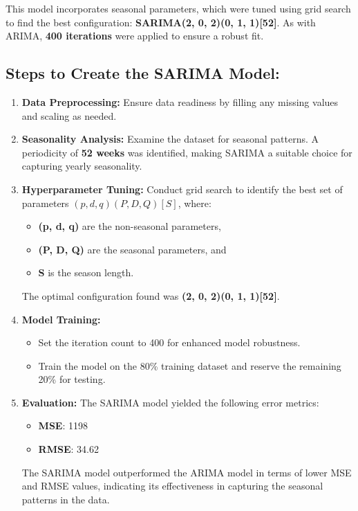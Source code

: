 This model incorporates seasonal parameters, which were tuned using grid search to find the best configuration: \textbf{SARIMA(2, 0, 2)(0, 1, 1)[52]}. As with ARIMA, \textbf{400 iterations} were applied to ensure a robust fit.

\subsection*{Steps to Create the SARIMA Model:}
\begin{enumerate}
	\item \textbf{Data Preprocessing:}  
	Ensure data readiness by filling any missing values and scaling as needed.
	
	\item \textbf{Seasonality Analysis:}  
	Examine the dataset for seasonal patterns. A periodicity of \textbf{52 weeks} was identified, making SARIMA a suitable choice for capturing yearly seasonality.
	
	\item \textbf{Hyperparameter Tuning:}  
	Conduct grid search to identify the best set of parameters $(p, d, q)(P, D, Q)[S]$, where:
	\begin{itemize}
		\item \textbf{(p, d, q)} are the non-seasonal parameters,
		\item \textbf{(P, D, Q)} are the seasonal parameters, and
		\item \textbf{S} is the season length.
	\end{itemize}
	The optimal configuration found was \textbf{(2, 0, 2)(0, 1, 1)[52]}.
	
	\item \textbf{Model Training:}
	\begin{itemize}
		\item Set the iteration count to 400 for enhanced model robustness.
		\item Train the model on the 80\% training dataset and reserve the remaining 20\% for testing.
	\end{itemize}
	
	\item \textbf{Evaluation:}  
	The SARIMA model yielded the following error metrics:
	\begin{itemize}
		\item \textbf{MSE}: 1198
		\item \textbf{RMSE}: 34.62
	\end{itemize}
	The SARIMA model outperformed the ARIMA model in terms of lower MSE and RMSE values, indicating its effectiveness in capturing the seasonal patterns in the data.
\end{enumerate}

